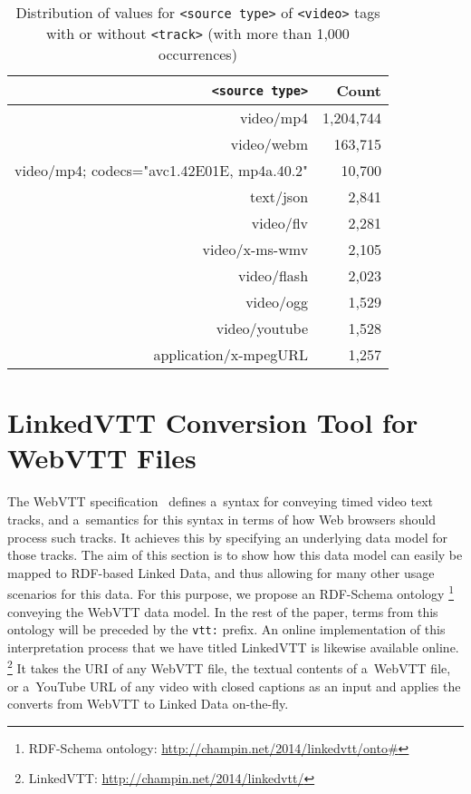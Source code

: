 \documentclass{sig-alternate}
\newcommand{\inlinelistingsize}{\fontsize{8pt}{11pt}}
\let\oldurl\url
\renewcommand{\url}[1]{\inlinelistingsize\oldurl{#1}}
\newcommand{\vtt}[1]{\texttt{vtt:#1}}
\begin{document}
\begin{table}[p]
  \centering
  \begin{tabular}{ r | r }
    \texttt{<source type>} & Count \\
    \hline
    video/mp4 & 1,204,744\\
    video/webm & 163,715\\
    video/mp4; codecs="avc1.42E01E, mp4a.40.2" & 10,700\\
    text/json & 2,841\\
    video/flv & 2,281\\
    video/x-ms-wmv & 2,105\\
    video/flash & 2,023\\
    video/ogg & 1,529\\
    video/youtube & 1,528\\
    application/x-mpegURL & 1,257\\    
  \end{tabular}
  \caption{Distribution of values for \texttt{<source type>}
    of \texttt{<video>} tags with or without  \texttt{<track>}
    \tiny (with more than 1,000 occurrences)}
  \label{table:typeFull}    
\end{table}

\section{LinkedVTT Conversion Tool for WebVTT Files}
\label{sec:linkedvtt-conversion-tool-for-webvtt-files}

The WebVTT specification~\cite{pfeiffer2013webvtt} defines a~syntax
for conveying timed video text tracks,
and a~semantics for this syntax in terms of how
Web browsers should process such tracks.
It achieves this by specifying an underlying data model for those tracks.
The aim of this section is to show
how this data model can easily be mapped to RDF-based Linked Data,
and thus allowing for many other usage scenarios for this data.
For this purpose, we propose an RDF-Schema ontology%
\footnote{RDF-Schema ontology:
\url{http://champin.net/2014/linkedvtt/onto\#}}
conveying the WebVTT data model.
In the rest of the paper, terms from this ontology
will be preceded by the \vtt{} prefix.
An online implementation of this interpretation process
that we have titled LinkedVTT is likewise available online.%
\footnote{LinkedVTT: \url{http://champin.net/2014/linkedvtt/}}
It takes the URI of any WebVTT file, the textual contents of a~WebVTT file,
or a~YouTube URL of any video with closed captions as an input
and applies the converts from WebVTT to Linked Data on-the-fly.
\end{document}
